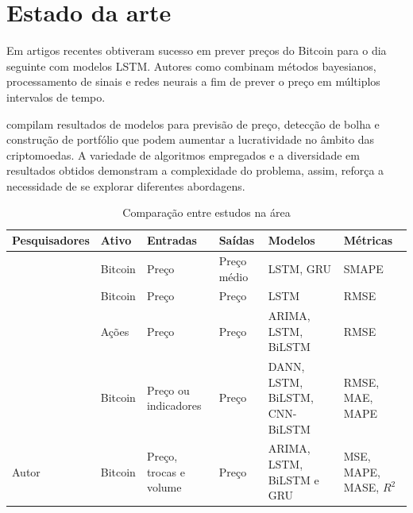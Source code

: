 
\section{Estado da arte} \label{sec:estado}

Em artigos recentes \textcite{Fer} obtiveram sucesso em prever preços do Bitcoin para o dia seguinte com modelos LSTM. Autores como \textcite{Tri} combinam métodos bayesianos, processamento de sinais e redes neurais a fim de prever o preço em múltiplos intervalos de tempo.

\textcite{Zhang} compilam resultados de modelos para previsão de preço, detecção de bolha e construção de portfólio que podem aumentar a lucratividade no âmbito das criptomoedas.
A variedade de algoritmos empregados e a diversidade em resultados obtidos demonstram a complexidade do problema, assim, reforça a necessidade de se explorar diferentes abordagens.

\begin{table}[!htb]
  \scriptsize
  \caption{Comparação entre estudos na área} \label{tabela:lista_estudos}
  \begin{tabularx}{\textwidth}{l|X|X|X|X|X} \hline
    Pesquisadores & Ativo & Entradas & Saídas & Modelos & Métricas \\ \hline
    \cite{lstmvsgru} & Bitcoin & Preço & Preço médio & LSTM, GRU & SMAPE \\ \hline
    \cite{Fer} & Bitcoin & Preço & Preço & LSTM & RMSE \\ \hline
    \cite{Siami} & Ações & Preço & Preço& ARIMA, LSTM, BiLSTM & RMSE \\ \hline
    \cite{Tri} & Bitcoin & Preço ou indicadores& Preço & DANN, LSTM, BiLSTM, CNN-BiLSTM & RMSE, MAE, MAPE \\ \hline
    Autor & Bitcoin & Preço, trocas e volume & Preço & ARIMA, LSTM, BiLSTM e GRU & MSE, MAPE, MASE, $R^2$ \\ \hline
  \end{tabularx}
\end{table}
